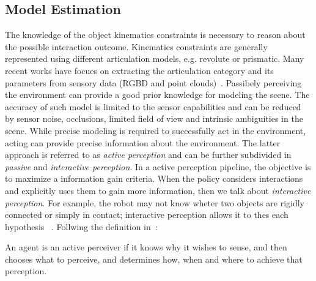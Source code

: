 \subsection{Model Estimation}

The knowledge of the object kinematics constraints is necessary to reason about the possible interaction outcome. Kinematics constraints are generally represented using different articulation models, e.g. revolute or prismatic. Many recent works have focues on extracting the articulation category and its parameters from sensory data (RGBD and point clouds)~\cite{abbatematteo2019learning, li2020category}. 
Passibely perceiving the environment can provide a good prior knowledge for modeling the scene. The accuracy of such model is limited to the sensor capabilities and can be reduced by sensor noise, occlusions, limited field of view and intrinsic ambiguities in the scene. While precise modeling is required to successfully act in the environment, acting can provide precise information about the environment. The latter approach is referred to as \emph{active perception} and can be further subdivided in \emph{passive} and \emph{interactive perception}. In a active perception pipeline, the objective is to maximize a information gain criteria. When the policy considers interactions and explicitly uses  them to gain more information, then we talk about \emph{interactive perception}. For example, the robot may not know wheter two objects are rigidly connected or simply in contact; interactive perception allows it to thes each hypothesis ~\citep{kroemer2019review}. Follwing the definition in~\cite{bajcsy2018revisiting}:
\begin{displayquote}
An agent is an active perceiver if it knows why it wishes to sense, and then chooses what to perceive, and determines how, when and where to achieve that perception.
\end{displayquote}  
